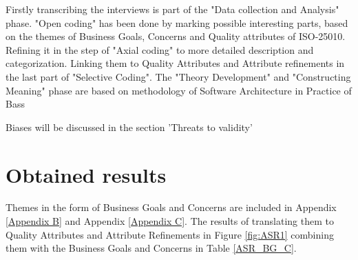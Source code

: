 Firstly transcribing the interviews is part of the "Data collection and Analysis" phase. "Open coding" has been done by marking possible interesting parts, based on the themes of Business Goals, Concerns and Quality attributes of ISO-25010. Refining it in the step of "Axial coding" to more detailed description and categorization. Linking them to Quality Attributes and Attribute refinements in the last part of "Selective Coding". The "Theory Development" and "Constructing Meaning" phase are based on methodology of Software Architecture in Practice of Bass\etal \cite{Bass2015SoftwareAI}

Biases will be discussed in the section 'Threats to validity'

\section{Obtained results}
Themes in the form of Business Goals and Concerns are included in Appendix \ref{Appendix B} and Appendix \ref{Appendix C}. The results of translating them to Quality Attributes and Attribute Refinements in Figure \ref{fig:ASR1} combining them with the Business Goals and Concerns in Table \ref{ASR_BG_C}.




